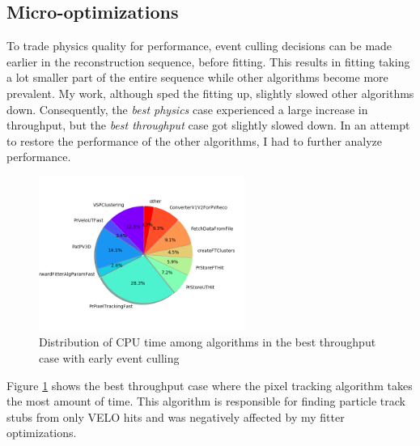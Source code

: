 \documentclass[12pt]{article}
\begin{document}
\subsection{Micro-optimizations}

To trade physics quality for performance, event culling decisions can be made earlier in the reconstruction sequence, before fitting. This results in fitting taking a lot smaller part of the entire sequence while other algorithms become more prevalent. My work, although sped the fitting up, slightly slowed other algorithms down. Consequently, the \textit{best physics} case experienced a large increase in throughput, but the \textit{best throughput} case got slightly slowed down. In an attempt to restore the performance of the other algorithms, I had to further analyze performance.

\begin{figure}[H]
	\begin{center}
		\includegraphics[width=0.6\textwidth]{algo_usage_original_bestthru}
	\end{center}
	\caption{Distribution of CPU time among algorithms in the best throughput case with early event culling}
	\label{fig_algo_usage_original_bestthru}
\end{figure}

Figure \ref{fig_algo_usage_original_bestthru} shows the best throughput case where the pixel tracking algorithm takes the most amount of time. This algorithm is responsible for finding particle track stubs from only VELO hits and was negatively affected by my fitter optimizations.
\end{document}

